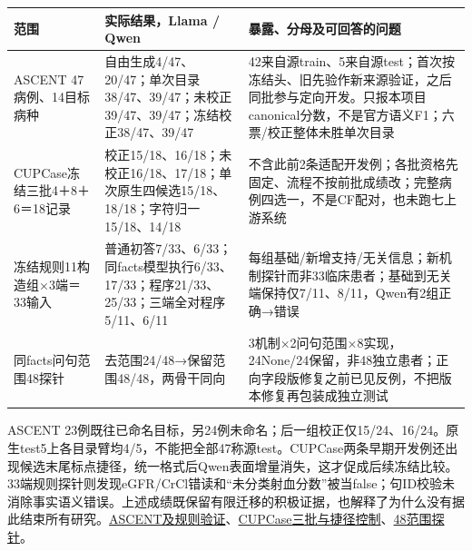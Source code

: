 \documentclass[
  11pt,
  a4paper,
]{article}
\newcounter{none} %
\begin{document}
{\def\LTcaptype{none} %
\begin{longtable}[]{@{}
  >{\raggedright\arraybackslash}p{}
  >{\raggedright\arraybackslash}p{}
  >{\raggedright\arraybackslash}p{}@{}}
\toprule\noalign{}
\begin{minipage}[b]{\linewidth}\raggedright
范围
\end{minipage} & \begin{minipage}[b]{\linewidth}\raggedright
实际结果，Llama / Qwen
\end{minipage} & \begin{minipage}[b]{\linewidth}\raggedright
暴露、分母及可回答的问题
\end{minipage} \\
\midrule\noalign{}
\endhead
\bottomrule\noalign{}
\endlastfoot
ASCENT 47病例、14目标病种 &
自由生成4/47、20/47；单次目录38/47、39/47；未校正39/47、39/47；冻结校正38/47、39/47
&
42来自源train、5来自源test；首次按冻结头、旧先验作新来源验证，之后同批参与定向开发。只报本项目canonical分数，不是官方语义F1；六票/校正整体未胜单次目录 \\
CUPCase冻结三批4＋8＋6＝18记录 &
校正15/18、16/18；未校正16/18、17/18；单次原生四候选15/18、18/18；字符归一15/18、14/18
&
不含此前2条适配开发例；各批资格先固定、流程不按前批成绩改；完整病例四选一，不是CF配对，也未跑七上游系统 \\
冻结规则11构造组×3端＝33输入 &
普通初答7/33、6/33；同facts模型执行6/33、17/33；程序21/33、25/33；三端全对程序5/11、6/11
&
每组基础/新增支持/无关信息；新机制探针而非33临床患者；基础到无关端保持仅7/11、8/11，Qwen有2组正确→错误 \\
同facts问句范围48探针 & 去范围24/48→保留范围48/48，两骨干同向 &
3机制×2问句范围×8实现，24None/24保留，非48独立患者；正向字段版修复之前已见反例，不把版本修复再包装成独立测试 \\
\end{longtable}
}

ASCENT
23例既往已命名目标，另24例未命名；后一组校正仅15/24、16/24。原生test5上各目录臂均4/5，不能把全部47称源test。CUPCase两条早期开发例还出现候选末尾标点捷径，统一格式后Qwen表面增量消失，这才促成后续冻结比较。33端规则探针则发现eGFR/CrCl错读和``未分类射血分数''被当false；句ID校验未消除事实语义错误。上述成绩既保留有限迁移的积极证据，也解释了为什么没有据此结束所有研究。\href{https://github.com/xiotakut/cf_mrg/blob/main/papers/2026-10-02_cf_moa/author_dossier/records/research/optimization.md\#L736}{ASCENT及规则验证}、\href{https://github.com/xiotakut/cf_mrg/blob/main/papers/2026-10-02_cf_moa/author_dossier/records/research/r3_candidate_comparison.md\#L1509}{CUPCase三批与捷径控制}、\href{https://github.com/xiotakut/cf_mrg/blob/main/papers/2026-10-02_cf_moa/author_dossier/records/research/r2_support_head.md\#L526}{48范围探针}。
\end{document}
